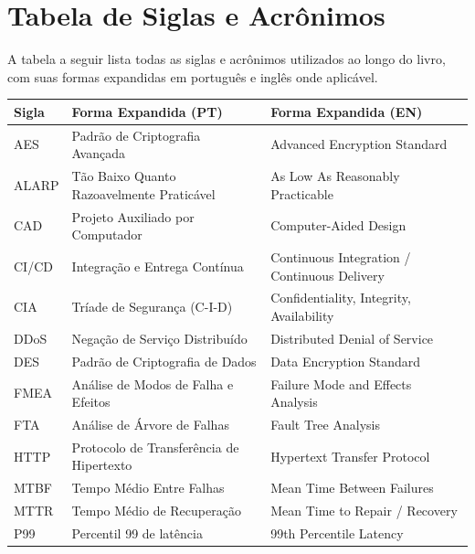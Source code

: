 \documentclass[12pt,a4paper,twoside]{report}
\begin{document}

\chapter{Tabela de Siglas e Acrônimos}

A tabela a seguir lista todas as siglas e acrônimos utilizados ao longo do livro, com suas formas expandidas em português e inglês onde aplicável.

\begin{table}[ht]
    \centering
    \renewcommand{\arraystretch}{1.4}
    \begin{tabular}{lp{5.5cm}p{6cm}}
        \toprule
        \textbf{Sigla} & \textbf{Forma Expandida (PT)} & \textbf{Forma Expandida (EN)} \\
        \midrule
        AES    & Padrão de Criptografia Avançada           & Advanced Encryption Standard \\
        ALARP  & Tão Baixo Quanto Razoavelmente Praticável & As Low As Reasonably Practicable \\
        CAD    & Projeto Auxiliado por Computador          & Computer-Aided Design \\
        CI/CD  & Integração e Entrega Contínua             & Continuous Integration / Continuous Delivery \\
        CIA    & Tríade de Segurança (C-I-D)               & Confidentiality, Integrity, Availability \\
        DDoS   & Negação de Serviço Distribuído            & Distributed Denial of Service \\
        DES    & Padrão de Criptografia de Dados           & Data Encryption Standard \\
        FMEA   & Análise de Modos de Falha e Efeitos       & Failure Mode and Effects Analysis \\
        FTA    & Análise de Árvore de Falhas               & Fault Tree Analysis \\
        HTTP   & Protocolo de Transferência de Hipertexto  & Hypertext Transfer Protocol \\
        MTBF   & Tempo Médio Entre Falhas                  & Mean Time Between Failures \\
        MTTR   & Tempo Médio de Recuperação                & Mean Time to Repair / Recovery \\
        P99    & Percentil 99 de latência                  & 99th Percentile Latency \\

\end{tabular}
\end{table}
\end{document}
